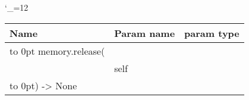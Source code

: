 \begingroup \catcode`\_=12 \tt
\begin{tabular}{lll}
\toprule
\textrm{Name}&\textrm{Param name}&\textrm{param type}\\
\midrule
\hbox to 0pt {memory.release(\hss}\\
& self\\
\hbox to 0pt{) -> None\hss}\\
\bottomrule
\end{tabular}
\endgroup
